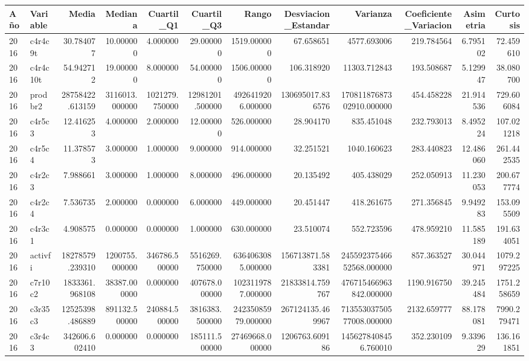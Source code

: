 \begin{tabular}{llrrrrrrrrrr}
\toprule
Año & Variable & Media & Mediana & Cuartil\_Q1 & Cuartil\_Q3 & Rango & Desviacion\_Estandar & Varianza & Coeficiente\_Variacion & Asimetria & Curtosis \\
\midrule
2016 & c4r4c9t & 30.784077 & 10.000000 & 4.000000 & 29.000000 & 1519.000000 & 67.658651 & 4577.693006 & 219.784564 & 6.795102 & 72.459610 \\
2016 & c4r4c10t & 54.942712 & 19.000000 & 8.000000 & 54.000000 & 1506.000000 & 106.318920 & 11303.712843 & 193.508687 & 5.129947 & 38.080700 \\
2016 & prodbr2 & 28758422.613159 & 3116013.000000 & 1021279.750000 & 12981201.500000 & 4926419206.000000 & 130695017.836576 & 17081187687302910.000000 & 454.458228 & 21.914536 & 729.606084 \\
2016 & c4r5c3 & 12.416253 & 4.000000 & 2.000000 & 12.000000 & 526.000000 & 28.904170 & 835.451048 & 232.793013 & 8.495224 & 107.021218 \\
2016 & c4r5c4 & 11.378573 & 3.000000 & 1.000000 & 9.000000 & 914.000000 & 32.251521 & 1040.160623 & 283.440823 & 12.486060 & 261.442535 \\
2016 & c4r2c3 & 7.988661 & 3.000000 & 1.000000 & 8.000000 & 496.000000 & 20.135492 & 405.438029 & 252.050913 & 11.230053 & 200.677774 \\
2016 & c4r2c4 & 7.536735 & 2.000000 & 0.000000 & 6.000000 & 449.000000 & 20.451447 & 418.261675 & 271.356845 & 9.949283 & 153.095509 \\
2016 & c4r3c1 & 4.908575 & 0.000000 & 0.000000 & 1.000000 & 630.000000 & 23.510074 & 552.723596 & 478.959210 & 11.585189 & 191.634051 \\
2016 & activfi & 18278579.239310 & 1200755.000000 & 346786.500000 & 5516269.750000 & 6364063085.000000 & 156713871.583381 & 24559237546652568.000000 & 857.363527 & 30.044971 & 1079.297225 \\
2016 & c7r10c2 & 1833361.968108 & 38387.000000 & 0.000000 & 407678.000000 & 1023119787.000000 & 21833814.759767 & 476715466963842.000000 & 1190.916750 & 39.245484 & 1751.258659 \\
2016 & c3r35c3 & 12525398.486889 & 891132.500000 & 240884.500000 & 3816383.500000 & 24235085979.000000 & 267124135.469967 & 71355303750577008.000000 & 2132.659777 & 88.178081 & 7990.279471 \\
2016 & c3r4c3 & 342606.602410 & 0.000000 & 0.000000 & 185111.500000 & 27469668.000000 & 1206763.609186 & 1456278408456.760010 & 352.230109 & 9.339629 & 136.161851 \\

\end{tabular}
